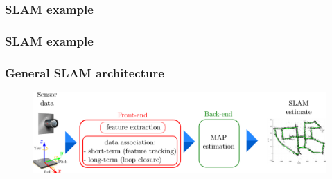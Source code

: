     \begin{frame}
     \frametitle{SLAM example}
    
     \begin{figure}
     \hfill{}
     \end{figure}
    
    \end{frame}
    
    \begin{frame}
     \frametitle{SLAM example}
    
     \begin{figure}
     \hfill{}
     \end{figure}
    
    \end{frame}
    
    \begin{frame}
     \frametitle{General SLAM architecture}
    
     \begin{figure}[!h]
     \includegraphics[width=\textwidth]{images/slam_frontend_backend.pdf}
     \end{figure}
    
\end{frame}


